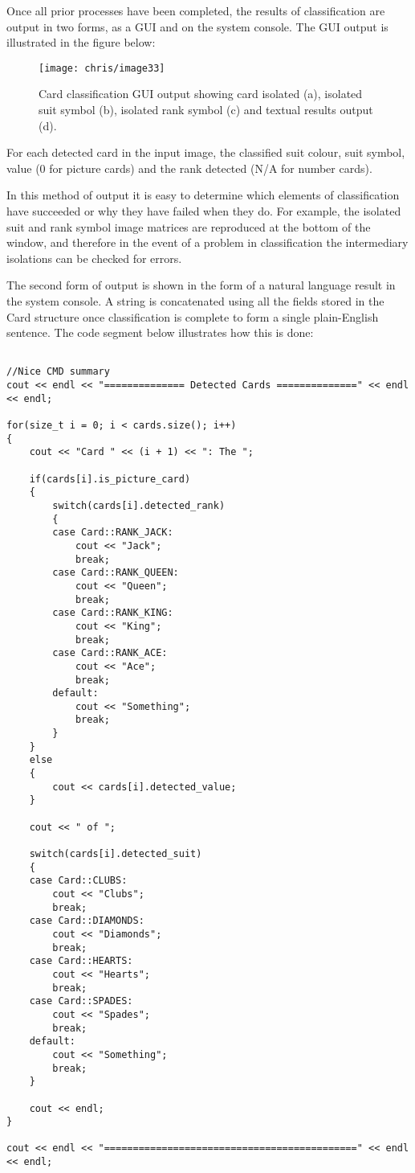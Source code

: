 		Once all prior processes have been completed, the results of classification are output in two forms, as a GUI and on the system console. The GUI output is illustrated in the figure below:
		
		\begin{figure}[H]
			\centering
			\texttt{[image: chris/image33]}
			\caption{Card classification GUI output showing card isolated (a), isolated suit symbol (b), isolated rank symbol (c) and textual results output (d).}
		\end{figure}

		For each detected card in the input image, the classified suit colour, suit symbol, value (0 for picture cards) and the rank detected (N/A for number cards).
		
		In this method of output it is easy to determine which elements of classification have succeeded or why they have failed when they do. For example, the isolated suit and rank symbol image matrices are reproduced at the bottom of the window, and therefore in the event of a problem in classification the intermediary isolations can be checked for errors. 
		
		The second form of output is shown in the form of a natural language result in the system console. A string is concatenated using all the fields stored in the Card structure once classification is complete to form a single plain-English sentence. The code segment below illustrates how this is done:

		\begin{lstlisting}

//Nice CMD summary
cout << endl << "============== Detected Cards ==============" << endl << endl;

for(size_t i = 0; i < cards.size(); i++)
{
    cout << "Card " << (i + 1) << ": The ";

    if(cards[i].is_picture_card)
    {
        switch(cards[i].detected_rank)
        {
        case Card::RANK_JACK:
            cout << "Jack";
            break;
        case Card::RANK_QUEEN:
            cout << "Queen";
            break;
        case Card::RANK_KING:
            cout << "King";
            break;
        case Card::RANK_ACE:
            cout << "Ace";
            break;
        default:
            cout << "Something";
            break;
        }
    }
    else
    {
        cout << cards[i].detected_value;
    }

    cout << " of ";

    switch(cards[i].detected_suit)
    {
    case Card::CLUBS:
        cout << "Clubs";
        break;
    case Card::DIAMONDS:
        cout << "Diamonds";
        break;
    case Card::HEARTS:
        cout << "Hearts";
        break;
    case Card::SPADES:
        cout << "Spades";
        break;
    default:
        cout << "Something";
        break;
    }

    cout << endl;
}

cout << endl << "============================================" << endl << endl;
		\end{lstlisting}

